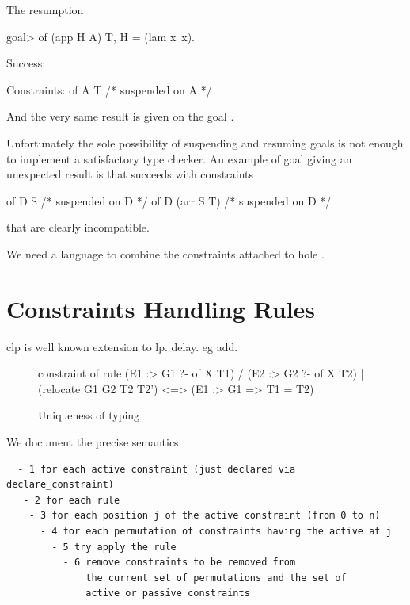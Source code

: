 \documentclass[a4paper, 11pt]{book}
\begin{document}
The resumption 

\begin{elpicode}
goal> of (app H A) T, H = (lam x\ x).

Success:

Constraints:
  of A T  /* suspended on A */
\end{elpicode}

And the very same result is given on the goal .
  
Unfortunately the sole possibility of suspending and resuming goals is
not enough to implement a satisfactory type checker. An example of
goal giving an unexpected result is 
that succeeds with constraints

\begin{elpicode}
  of D S  /* suspended on D */
  of D (arr S T)  /* suspended on D */
\end{elpicode}

that are clearly incompatible.

We need a language to combine the constraints attached to hole .

\section{Constraints Handling Rules}

clp is well known extension to lp. delay. eg add.

\cite{chr}
\cite{10.1007/978-3-540-27775-0_7}


\begin{figure}
\begin{elpicode}
constraint of {
  rule (E1 :> G1 ?- of X T1) / (E2 :> G2 ?- of X T2)
    | (relocate G1 G2 T2 T2')
    <=> (E1 :> G1 => T1 = T2)
}
\end{elpicode}
\caption[UT]{Uniqueness of typing}
\end{figure}

We document the precise semantics

\begin{verbatim}
  - 1 for each active constraint (just declared via declare_constraint)
   - 2 for each rule
    - 3 for each position j of the active constraint (from 0 to n)
      - 4 for each permutation of constraints having the active at j
        - 5 try apply the rule
          - 6 remove constraints to be removed from
              the current set of permutations and the set of
              active or passive constraints
\end{verbatim}
\end{document}
